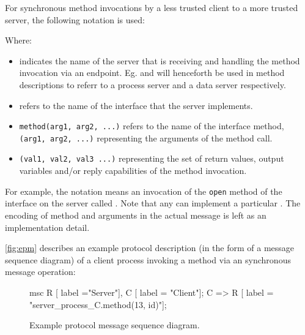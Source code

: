 For synchronous method invocations by a less trusted client to a more trusted
server, the following notation is used:

\begin{center}
\end{center}

Where:

\begin{itemize} 
	\item
	 indicates the name of the server that is receiving and
	handling the method invocation via an endpoint. Eg.  and
	 will henceforth be used in method descriptions to referr to
	a process server and a data server respectively.
	
	\item
	 refers to the name of the interface that the server
	implements.

	\item
	\texttt{method(arg1, arg2, ...)} refers to the name of the interface
	method, \texttt{(arg1, arg2, ...)} representing the arguments of the method
	call.

	\item
	\texttt{(val1, val2, val3 ...)} representing the set of return values, output variables
	and/or reply capabilities of the method invocation.
\end{itemize}

For example, the notation  means an invocation
of the \texttt{open} method of the  interface on the server
called . Note that any  can implement a particular
.  The encoding of method and arguments in the actual message is
left as an implementation detail.

\autoref{fig:epm} describes an example protocol description (in the form of a
message sequence diagram) of a client process invoking a method via an
synchronous message operation:

\begin{figure}[htb]
  \centering
  \begin{msc}
    msc {
      R [ label ="Server"],
      C [ label = "Client"];
      C => R [ label = "server\_process\_C.method(13, id)"];
    }
  \end{msc}
  \caption{Example protocol message sequence diagram.}
  \label{fig:epm}
\end{figure}

